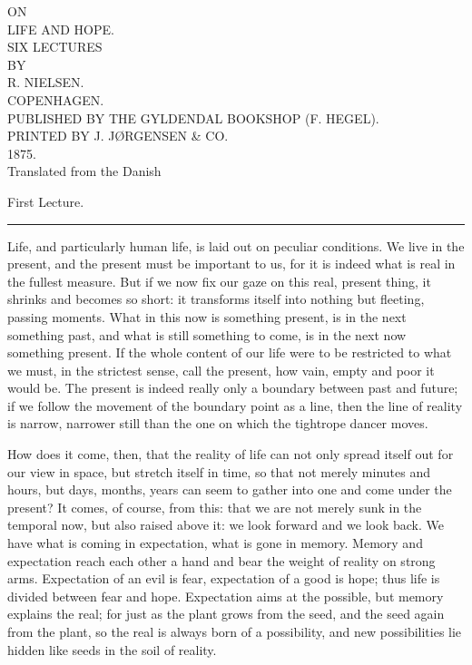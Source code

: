 \documentclass[12pt,a4paper,openany]{book}
\newcommand{\opage}[1]{\marginnote{\footnotesize\textit{[#1]}}}
\newcommand{\lecture}[1]{\clearpage\phantomsection\addcontentsline{toc}{chapter}{#1}\begin{center}{\large #1}\\[0.4em]\rule{3em}{0.4pt}\end{center}\medskip\noindent}
\begin{document}
\begin{titlepage}
\begin{center}
\vspace*{2em}
{\small ON}\\[1em]
{\Huge LIFE AND HOPE.}\\[2.5em]
SIX LECTURES\\[1em]
{\small BY}\\[1em]
{\large R. NIELSEN.}\\[5em]
{\large COPENHAGEN.}\\[0.5em]
PUBLISHED BY THE GYLDENDAL BOOKSHOP (F. HEGEL).\\[0.5em]
{\small PRINTED BY J. JØRGENSEN \& CO.}\\[0.5em]
{\small 1875.}\\[3em]
{\small Translated from the Danish}
\end{center}
\end{titlepage}

\renewcommand{\contentsname}{Contents {\normalsize\textit{(editorial; not in the print)}}}
\tableofcontents
\clearpage

\setcounter{footnote}{0}%
\lecture{First Lecture.}\opage{1}Life, and particularly human life, is laid out on peculiar
conditions. We live in the present, and the present must be important to us, for it is indeed what
is real in the fullest measure. But if we now fix our gaze on this real, present thing, it shrinks
and becomes so short: it transforms itself into nothing but fleeting, passing moments. What in this
now is something present, is in the next something past, and what is still something to come, is in
the next now something present. If the whole content of our life were to be restricted to what we
must, in the strictest sense, call the present, how vain, empty and poor it would be. The present is
indeed really only a boundary between past and future; if we follow the movement of the boundary
point as a line, then the line of reality is narrow, narrower still than the one on which the
tightrope dancer moves.

How does it come, then, that the reality of life can not only spread itself out for our view in
space, but stretch itself in time, so that not merely minutes and hours, but days, months, years can
seem to gather into one and come under the present? It comes, of course, from this: that we are not
merely sunk in the temporal
\setcounter{footnote}{0}%
\opage{2}now, but also raised above it: we look forward and we look back. We have what is coming in
expectation, what is gone in memory. Memory and expectation reach each other a hand and bear the
weight of reality on strong arms. Expectation of an evil is fear, expectation of a good is hope;
thus life is divided between fear and hope. Expectation aims at the possible, but memory explains
the real; for just as the plant grows from the seed, and the seed again from the plant, so the real
is always born of a possibility, and new possibilities lie hidden like seeds in the soil of reality.
\end{document}
